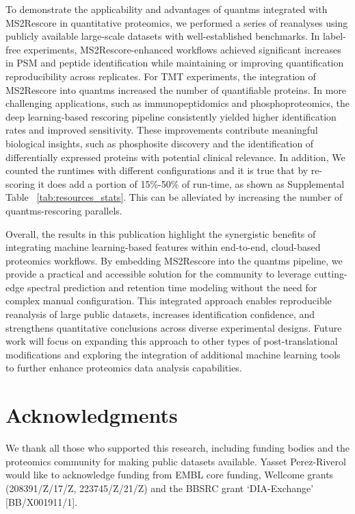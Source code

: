 \documentclass[12pt]{article}
\begin{document}
To demonstrate the applicability and advantages of quantms integrated with MS2Rescore in quantitative proteomics, we performed a series of reanalyses using publicly available large-scale datasets with well-established benchmarks. In label-free experiments, MS2Rescore-enhanced workflows achieved significant increases in PSM and peptide identification while maintaining or improving quantification reproducibility across replicates. For TMT experiments, the integration of MS2Rescore into quantms increased the number of quantifiable proteins. In more challenging applications, such as immunopeptidomics and phosphoproteomics, the deep learning-based rescoring pipeline consistently yielded higher identification rates and improved sensitivity. These improvements contribute meaningful biological insights, such as phosphosite discovery and the identification of differentially expressed proteins with potential clinical relevance. In addition, We counted the runtimes with different configurations and it is true that by re-scoring it does add a portion of 15\%-50\% of run-time, as shown as Supplemental Table ~\ref{tab:resources_stats}. This can be alleviated by increasing the number of quantms-rescoring parallels.

Overall, the results in this publication highlight the synergistic benefits of integrating machine learning-based features within end-to-end, cloud-based proteomics workflows. By embedding MS2Rescore into the quantms pipeline, we provide a practical and accessible solution for the community to leverage cutting-edge spectral prediction and retention time modeling without the need for complex manual configuration. This integrated approach enables reproducible reanalysis of large public datasets, increases identification confidence, and strengthens quantitative conclusions across diverse experimental designs. Future work will focus on expanding this approach to other types of post-translational modifications and exploring the integration of additional machine learning tools to further enhance proteomics data analysis capabilities.

\section*{Acknowledgments}
We thank all those who supported this research, including funding bodies and the proteomics community for making public datasets available. 
Yasset Perez-Riverol would like to acknowledge funding from EMBL core funding, Wellcome grants (208391/Z/17/Z, 223745/Z/21/Z) and the BBSRC grant ‘DIA-Exchange’ [BB/X001911/1].
\end{document}
